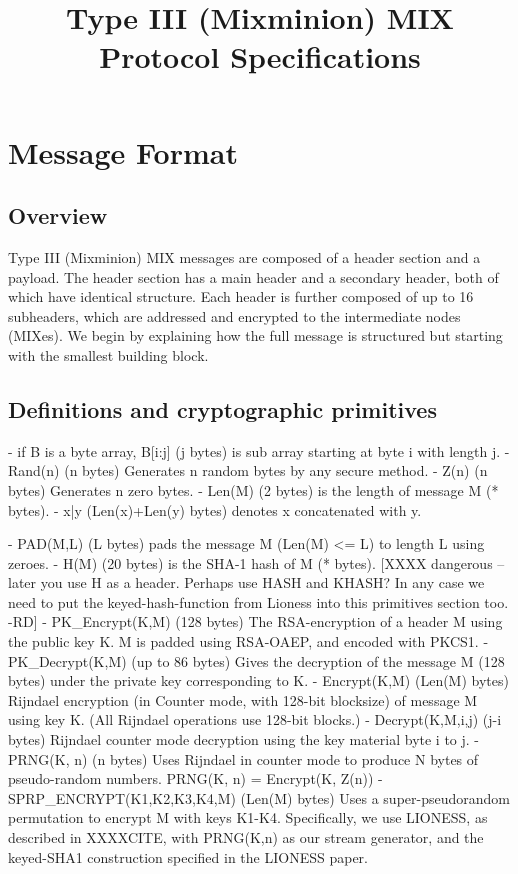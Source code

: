 \title{Type III (Mixminion) MIX Protocol Specifications}

\section{Message Format}

\subsection{Overview}

Type III (Mixminion) MIX messages are composed of a header section and a
payload.  The header section has a main header and a
secondary header, both of which have identical structure.  Each
header is further composed of up to 16 subheaders, which are
addressed and encrypted to the intermediate nodes (MIXes).  We
begin by explaining how the full message is structured but starting
with the smallest building block.

\subsection{Definitions and cryptographic primitives}

- if B is a byte array, B[i:j] (j bytes) is sub array starting at 
  byte i with length j.
- Rand(n) (n bytes) Generates n random bytes by any secure method.
- Z(n) (n bytes) Generates n zero bytes.
- Len(M) (2 bytes) is the length of message M (* bytes).
- x|y (Len(x)+Len(y) bytes) denotes x concatenated with y.

- PAD(M,L) (L bytes) pads the message M (Len(M) <= L) to length L
  using zeroes.
- H(M) (20 bytes) is the SHA-1 hash of M (* bytes).
[XXXX dangerous -- later you use H as a header. Perhaps use HASH
  and KHASH? In any case we need to put the keyed-hash-function
  from Lioness into this primitives section too. -RD]
- PK_Encrypt(K,M) (128 bytes) The RSA-encryption of a header M 
  using the public key K.  M is padded using RSA-OAEP, and encoded
  with PKCS1.
- PK_Decrypt(K,M) (up to 86 bytes) Gives the decryption of the
  message M (128 bytes) under the private key corresponding to K.
- Encrypt(K,M) (Len(M) bytes) Rijndael encryption (in Counter mode,
  with 128-bit blocksize) of message M using key K.  (All Rijndael
  operations use 128-bit blocks.)
- Decrypt(K,M,i,j) (j-i bytes) Rijndael counter mode decryption 
  using the key material byte i to j.
- PRNG(K, n) (n bytes) Uses Rijndael in counter mode to produce N
  bytes of pseudo-random numbers.
  PRNG(K, n) = Encrypt(K, Z(n))
- SPRP_ENCRYPT(K1,K2,K3,K4,M) (Len(M) bytes) Uses a super-pseudorandom
  permutation to encrypt M with keys K1-K4.  Specifically, we use LIONESS,
  as described in XXXXCITE, with PRNG(K,n) as our stream generator,
  and the keyed-SHA1 construction specified in the LIONESS paper.

